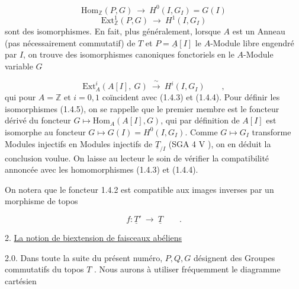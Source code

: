 \begin{equation}\tag{1.4.3}
\mathrm{Hom}_{\mathbb{Z}}(P,G) \ \longrightarrow\ H^0(I,G_I) = G(I)
\end{equation}
\begin{equation}\tag{1.4.4}
\mathrm{Ext}^1_{\mathbb{Z}}(P,G) \ \longrightarrow\ H^1(I,G_I)
\end{equation}
sont des isomorphismes. En fait, plus généralement, lorsque $A$ est un Anneau (pas nécessairement commutatif) de \underline{$T$} et $P = \underline{A}[I]$ le $A$-Module libre engendré par $I$, on trouve des isomorphismes canoniques fonctoriels en le $A$-Module variable $G$

\begin{equation}\tag{1.4.5}
\mathrm{Ext}^i_A(A[I],\ G) \ \xrightarrow{\ \sim\ }\ H^i(I,G_I) \qquad ,
\end{equation}
qui pour $A=\mathbb{Z}$ et $i=0,1$ coïncident avec (1.4.3) et (1.4.4). Pour définir les isomorphismes (1.4.5), on se rappelle que le premier membre est le foncteur dérivé du foncteur $G \longmapsto \mathrm{Hom}_A(A[I],G)$, qui par définition de $A[I]$ est isomorphe au foncteur $G \longmapsto G(I) = H^0(I,G_I)$. Comme $G \longmapsto G_I$ transforme Modules injectifs en Modules injectifs de $\underline{T}_{/I}$ (SGA 4 V     ), on en déduit la conclusion voulue. On laisse au lecteur le soin de vérifier la compatibilité annoncée avec les homomorphismes (1.4.3) et (1.4.4).

On notera que le foncteur 1.4.2 est compatible aux images inverses par un morphisme de topos

\begin{equation*}
f : \underline{T}' \ \longrightarrow\ \underline{T} \qquad .
\end{equation*}



2. \underline{La notion de biextension  de faisceaux abéliens}

2.0.  Dans toute la suite du présent numéro, $P,Q,G$ désignent des Groupes commutatifs du topos \underline{$T$} . Nous aurons à utiliser fréquemment le diagramme cartésien

